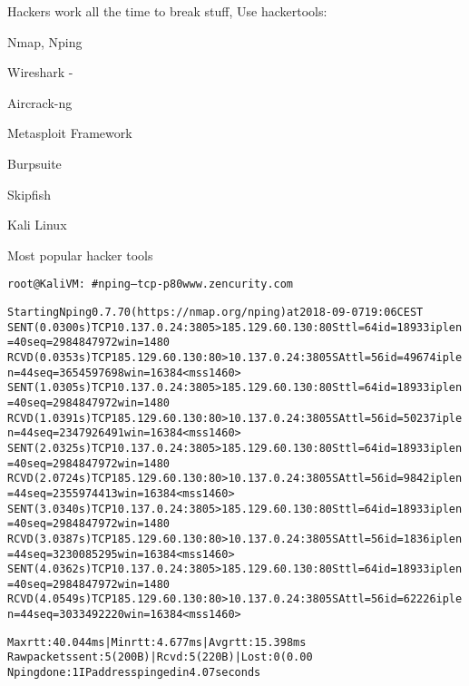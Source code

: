 \documentclass[20pt,landscape,a4paper,footrule]{foils}
\begin{document}
\begin{list2}
\item Hackers work all the time to break stuff, Use hackertools:
\item Nmap, Nping 
\item Wireshark - 
\item Aircrack-ng 
\item Metasploit Framework 
\item Burpsuite 
\item Skipfish 
\item Kali Linux 
\end{list2}

\vskip 5mm
\centerline{Most popular hacker tools }




\begin{alltt}\footnotesize
  root@KaliVM:~# nping --tcp -p 80 www.zencurity.com

  Starting Nping 0.7.70 ( https://nmap.org/nping ) at 2018-09-07 19:06 CEST
  SENT (0.0300s) TCP 10.137.0.24:3805 > 185.129.60.130:80 S ttl=64 id=18933 iplen=40  seq=2984847972 win=1480
  RCVD (0.0353s) TCP 185.129.60.130:80 > 10.137.0.24:3805 SA ttl=56 id=49674 iplen=44  seq=3654597698 win=16384 <mss 1460>
  SENT (1.0305s) TCP 10.137.0.24:3805 > 185.129.60.130:80 S ttl=64 id=18933 iplen=40  seq=2984847972 win=1480
  RCVD (1.0391s) TCP 185.129.60.130:80 > 10.137.0.24:3805 SA ttl=56 id=50237 iplen=44  seq=2347926491 win=16384 <mss 1460>
  SENT (2.0325s) TCP 10.137.0.24:3805 > 185.129.60.130:80 S ttl=64 id=18933 iplen=40  seq=2984847972 win=1480
  RCVD (2.0724s) TCP 185.129.60.130:80 > 10.137.0.24:3805 SA ttl=56 id=9842 iplen=44  seq=2355974413 win=16384 <mss 1460>
  SENT (3.0340s) TCP 10.137.0.24:3805 > 185.129.60.130:80 S ttl=64 id=18933 iplen=40  seq=2984847972 win=1480
  RCVD (3.0387s) TCP 185.129.60.130:80 > 10.137.0.24:3805 SA ttl=56 id=1836 iplen=44  seq=3230085295 win=16384 <mss 1460>
  SENT (4.0362s) TCP 10.137.0.24:3805 > 185.129.60.130:80 S ttl=64 id=18933 iplen=40  seq=2984847972 win=1480
  RCVD (4.0549s) TCP 185.129.60.130:80 > 10.137.0.24:3805 SA ttl=56 id=62226 iplen=44  seq=3033492220 win=16384 <mss 1460>

  Max rtt: 40.044ms | Min rtt: 4.677ms | Avg rtt: 15.398ms
  Raw packets sent: 5 (200B) | Rcvd: 5 (220B) | Lost: 0 (0.00%)
  Nping done: 1 IP address pinged in 4.07 seconds
\end{alltt}
\end{document}
